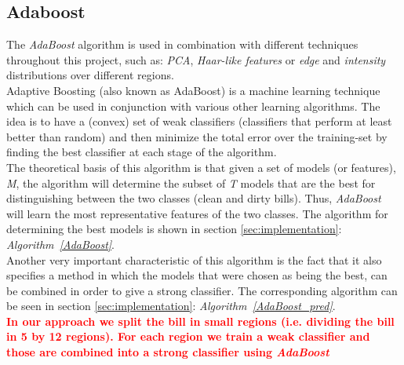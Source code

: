 \documentclass[11pt,twocolumn]{article}
\newcommand{\todo}[1]{\textcolor{red}{\textbf{#1}}}
\begin{document}
		\subsection{Adaboost}\label{sec:Adaboost}
			\hspace*{10px}The \emph{AdaBoost} algorithm is used in combination with
			different techniques throughout this project, such as: \emph{PCA},
			\emph{Haar-like features} or \emph{edge} and \emph{intensity} distributions
			over different regions.\\ \hspace*{10px}Adaptive Boosting (also known as
			AdaBoost) is a machine learning technique which can be used in conjunction
			with various other learning algorithms. The idea is to have a (convex) set of
			weak classifiers (classifiers that perform at least better than random) and
			then minimize the total error over the training-set by finding the best
			classifier at each stage of the algorithm.\\ 
			\hspace*{10px}The theoretical basis of this algorithm is that given a set of
			models (or features), \emph{M}, the algorithm will determine the subset of
			\emph{T} models that are the best for distinguishing between the two classes
			(clean and dirty bills). Thus, \emph{AdaBoost} will learn the most
			representative features of the two classes. The algorithm for determining the
			best models is shown in section \ref{sec:implementation}:
			\emph{Algorithm~\ref{AdaBoost}}.\\ 
			\hspace*{10px}Another very important characteristic of this algorithm is the
			fact that it also specifies a method in which the models that were chosen as
			being the best, can be combined in order to give a strong classifier. The
			corresponding algorithm can be seen in section \ref{sec:implementation}:
			\emph{Algorithm~\ref{AdaBoost_pred}}.\\
			\hspace*{10px}\todo{In our approach we split the bill in small regions (i.e.
			dividing the bill in 5 by 12 regions). For each region we train a weak
			classifier and those are combined into a strong classifier using
			\emph{AdaBoost}}
			 
\end{document}
